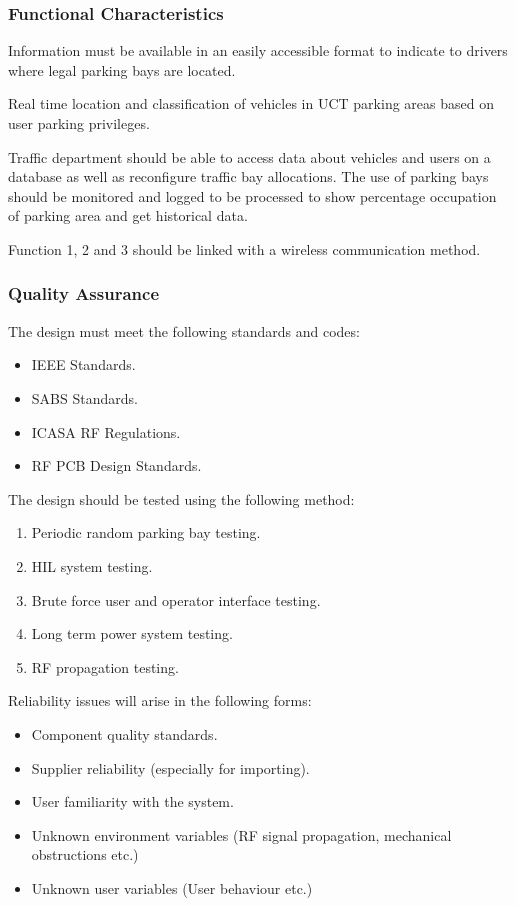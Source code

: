 \subsubsection{Functional Characteristics}
Information must be available in an easily accessible format to indicate to drivers where legal parking bays are located.

Real time location and classification of vehicles in UCT parking areas based on user parking privileges. 

Traffic department should be able to access data about vehicles and users on a database as well as reconfigure traffic bay allocations. The use of parking bays should be monitored and logged to be processed to show percentage occupation of parking area and get historical data.

Function 1, 2 and 3 should be linked with a wireless communication method.

\newpage
\subsubsection{Quality Assurance}
The design must meet the following standards and codes:
\begin{itemize}
\item IEEE Standards.
\item SABS Standards.
\item ICASA RF Regulations.
\item RF PCB Design Standards.
\end{itemize}

The design should be tested using the following method:
\begin{enumerate}
\item Periodic random parking bay testing.
\item HIL system testing.
\item Brute force user and operator interface testing.
\item Long term power system testing.
\item RF propagation testing.
\end{enumerate}


Reliability issues will arise in the following forms:

\begin{itemize}
\item Component quality standards.
\item Supplier reliability (especially for importing).
\item User familiarity with the system.
\item Unknown environment variables (RF signal propagation, mechanical obstructions etc.)
\item Unknown user variables (User behaviour etc.)
\end{itemize}

